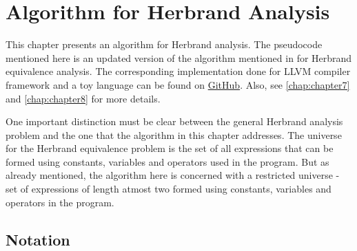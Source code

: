 \chapter{Algorithm for Herbrand Analysis}
\label{chap:chapter4}

This chapter presents an algorithm for Herbrand analysis. The pseudocode  
mentioned here is an updated version of the algorithm mentioned in \cite{Babu} 
for Herbrand equivalence analysis. The corresponding implementation done for 
LLVM compiler framework and a toy language can be found on 
\href{https://www.github.com/himanshu520/HerbrandEquivalence}{GitHub}.
Also, see \autoref{chap:chapter7} and \autoref{chap:chapter8} for more details.

One important distinction must be clear between the general Herbrand analysis problem
and the one that the algorithm in this chapter addresses. The universe for the Herbrand 
equivalence problem is the set of all expressions that can be formed using constants, 
variables and operators used in the program. But as already mentioned, the algorithm 
here is concerned with a restricted universe - set of expressions of length atmost two 
formed using constants, variables and operators in the program. 

\section{Notation}
\label{sec:NotationPseudocode}

